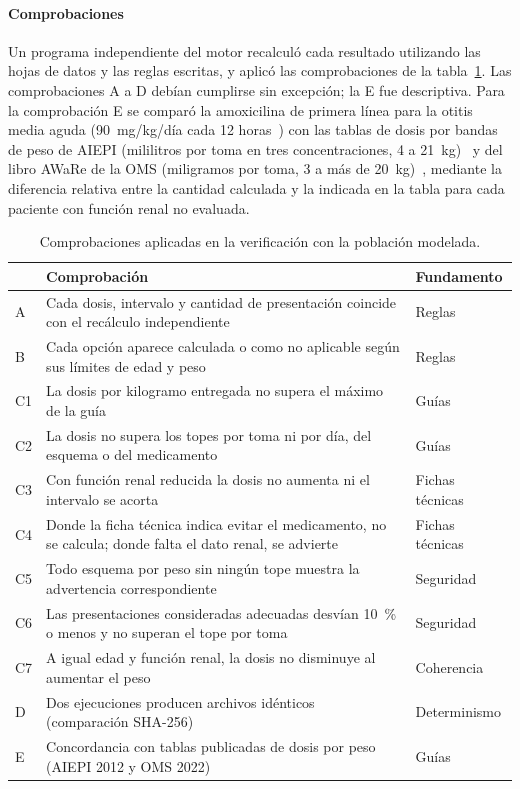 \documentclass[11pt,a4paper]{article}
\begin{document}
\paragraph{Comprobaciones} Un programa independiente del motor recalculó cada resultado utilizando las hojas de datos y las reglas escritas, y aplicó las comprobaciones de la tabla~\ref{tab:comprobaciones}. Las comprobaciones A a D debían cumplirse sin excepción; la E fue descriptiva. Para la comprobación E se comparó la amoxicilina de primera línea para la otitis media aguda (90~mg/kg/día cada 12 horas~\citep{acorloma2024}) con las tablas de dosis por bandas de peso de AIEPI (mililitros por toma en tres concentraciones, 4 a 21~kg)~\citep{aiepi2012} y del libro AWaRe de la OMS (miligramos por toma, 3 a más de 20~kg)~\citep{aware2022}, mediante la diferencia relativa entre la cantidad calculada y la indicada en la tabla para cada paciente con función renal no evaluada.

\begin{table}[htbp]
\centering
\caption{Comprobaciones aplicadas en la verificación con la población modelada.}
\label{tab:comprobaciones}
\small
\begin{tabularx}{\textwidth}{@{}lXl@{}}
\toprule
& Comprobación & Fundamento \\
\midrule
A & Cada dosis, intervalo y cantidad de presentación coincide con el recálculo independiente & Reglas \\
B & Cada opción aparece calculada o como no aplicable según sus límites de edad y peso & Reglas \\
C1 & La dosis por kilogramo entregada no supera el máximo de la guía & Guías \\
C2 & La dosis no supera los topes por toma ni por día, del esquema o del medicamento & Guías \\
C3 & Con función renal reducida la dosis no aumenta ni el intervalo se acorta & Fichas técnicas \\
C4 & Donde la ficha técnica indica evitar el medicamento, no se calcula; donde falta el dato renal, se advierte & Fichas técnicas \\
C5 & Todo esquema por peso sin ningún tope muestra la advertencia correspondiente & Seguridad \\
C6 & Las presentaciones consideradas adecuadas desvían 10~\% o menos y no superan el tope por toma & Seguridad \\
C7 & A igual edad y función renal, la dosis no disminuye al aumentar el peso & Coherencia \\
D & Dos ejecuciones producen archivos idénticos (comparación SHA-256) & Determinismo \\
E & Concordancia con tablas publicadas de dosis por peso (AIEPI 2012 y OMS 2022) & Guías \\
\bottomrule
\end{tabularx}
\end{table}
\end{document}
